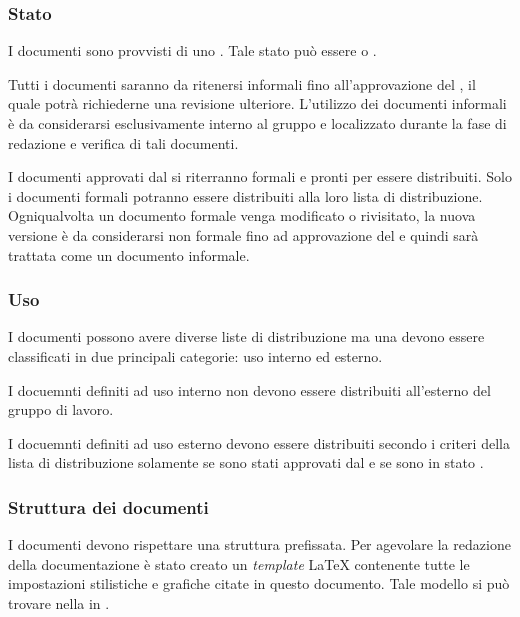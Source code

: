 \documentclass[12pt,a4paper]{article}
\begin{document}
\subsubsection{Stato}
I documenti sono provvisti di uno . Tale stato può essere  o  .

Tutti i documenti saranno da ritenersi informali fino all’approvazione del \PM, il quale potrà richiederne una revisione ulteriore. L’utilizzo dei documenti informali è da considerarsi esclusivamente interno al gruppo e localizzato durante la fase di redazione e verifica di tali documenti.

I documenti approvati dal \PM{} si riterranno formali e pronti per essere distribuiti. Solo i documenti formali potranno essere distribuiti alla loro lista di distribuzione. Ogniqualvolta un documento formale venga modificato o rivisitato, la nuova versione è da considerarsi non formale fino ad approvazione del \PM e quindi sarà trattata come un documento informale.

\subsubsection{Uso}
I documenti possono avere diverse liste di distribuzione ma una devono essere classificati in due principali categorie: uso interno ed esterno.

I docuemnti definiti ad uso interno non devono essere distribuiti all'esterno del gruppo di lavoro.

I docuemnti definiti ad uso esterno devono essere distribuiti secondo i criteri della lista di distribuzione solamente se sono stati approvati dal \PM{} e se sono in stato .

\subsubsection{Struttura dei documenti}
I documenti devono rispettare una struttura prefissata. Per agevolare la redazione della documentazione è stato creato un \emph{template} \LaTeX{} contenente tutte le impostazioni stilistiche e grafiche citate in questo documento. Tale modello si può trovare nella  in .
\end{document}
